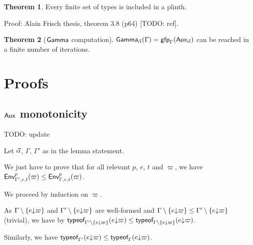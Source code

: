 \documentclass[a4paper]{article}
\theoremstyle{definition}
\newtheorem{theorem}{Theorem}
\begin{document}
        \begin{theorem}
          Every finite set of types is included in a plinth.
        \end{theorem}
        Proof: Alain Frisch thesis, theorem 3.8 (p64) [TODO: ref].

        \begin{theorem}[$\textsf{Gamma}_{}$ computation]
          $\textsf{Gamma}_{\vec \alpha}(\Gamma)=\textsf{gfp}_\Gamma (\textsf{Aux}_{\vec \alpha})$ can be reached in a finite number of iterations.
        \end{theorem}

    \section{Proofs}

    \subsection{$\textsf{Aux}_{}$ monotonicity}
    
      TODO: update

      Let $\vec \alpha$, $\Gamma$, $\Gamma'$ as in the lemma statement.

      We just have to prove that for all relevant $p$, $e$, $t$ and $\varpi$, we have $\textsf{Env}^{p}_{\Gamma',e,t} (\varpi) \leq \textsf{Env}^{p}_{\Gamma,e,t} (\varpi)$.

      We proceed by induction on $\varpi$. 

      As $\Gamma\setminus\{e{\downarrow}\varpi\}$ and $\Gamma'\setminus\{e{\downarrow}\varpi\}$ are well-formed and $\Gamma\setminus\{e{\downarrow}\varpi\} \leq \Gamma'\setminus\{e{\downarrow}\varpi\}$ (trivial),
      we have by $\textsf{typeof}_{\Gamma'\setminus\{e{\downarrow}\varpi\}}(e{\downarrow}\varpi) \leq \textsf{typeof}_{\Gamma\setminus\{e{\downarrow}\varpi\}}(e{\downarrow}\varpi)$.

      Similarly, we have $\textsf{typeof}_{\Gamma'}(e{\downarrow}\varpi) \leq \textsf{typeof}_{\Gamma}(e{\downarrow}\varpi)$.
\end{document}
